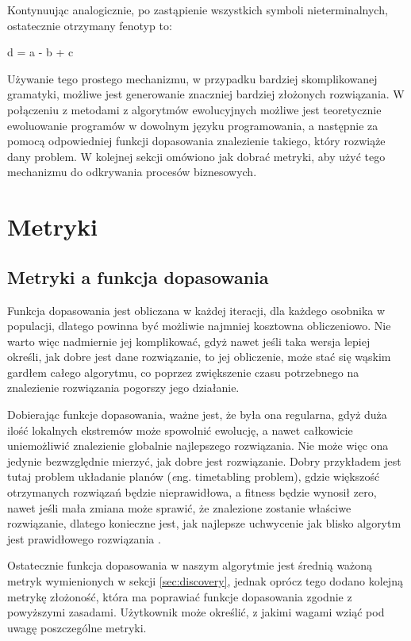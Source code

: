 Kontynuując analogicznie, po zastąpienie wszystkich symboli nieterminalnych, ostatecznie otrzymany fenotyp to:
\begin{center} d = a - b + c \end{center}	
Używanie tego prostego mechanizmu, w przypadku bardziej skomplikowanej gramatyki, możliwe jest generowanie znaczniej bardziej złożonych rozwiązania. W połączeniu z metodami z algorytmów ewolucyjnych możliwe jest teoretycznie ewoluowanie programów w dowolnym języku programowania, a następnie za pomocą odpowiedniej funkcji dopasowania znalezienie takiego, który rozwiąże dany problem. W kolejnej sekcji omówiono jak dobrać metryki, aby użyć tego mechanizmu do odkrywania procesów biznesowych.



\section{Metryki}
\label{sec:metryki}

\subsection{Metryki a funkcja dopasowania}

Funkcja dopasowania jest obliczana w każdej iteracji, dla każdego osobnika w populacji, dlatego powinna być możliwie najmniej kosztowna obliczeniowo. Nie warto więc nadmiernie jej komplikować, gdyż nawet jeśli taka wersja lepiej określi, jak dobre jest dane rozwiązanie, to jej obliczenie, może stać się wąskim gardłem całego algorytmu, co poprzez zwiększenie czasu potrzebnego na znalezienie rozwiązania pogorszy jego działanie. 

Dobierając funkcje dopasowania, ważne jest, że była ona regularna, gdyż duża ilość lokalnych ekstremów może spowolnić ewolucję, a nawet całkowicie uniemożliwić znalezienie globalnie najlepszego rozwiązania.
Nie może więc ona jedynie bezwzględnie mierzyć, jak dobre jest rozwiązanie. Dobry przykładem jest tutaj problem układanie planów (\textit eng. timetabling problem), gdzie większość otrzymanych rozwiązań będzie nieprawidłowa, a fitness będzie wynosił zero, nawet jeśli mała zmiana może sprawić, że znalezione zostanie właściwe rozwiązanie, dlatego konieczne jest, jak najlepsze uchwycenie jak blisko algorytm jest prawidłowego rozwiązania \cite{icga85:cramer} \cite{beasley:1993:ogapf}.

Ostatecznie funkcja dopasowania w naszym algorytmie jest średnią ważoną metryk wymienionych w sekcji \ref{sec:discovery}, jednak oprócz tego dodano kolejną metrykę złożoność, która ma poprawiać funkcje dopasowania zgodnie z powyższymi zasadami. Użytkownik może określić, z jakimi wagami wziąć pod uwagę poszczególne metryki.

